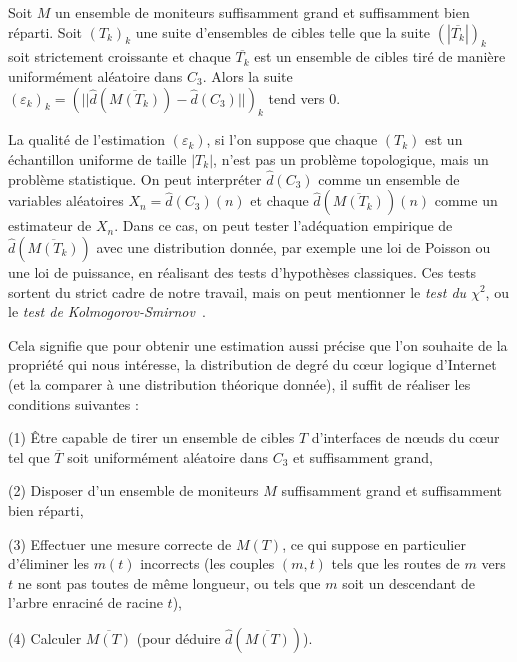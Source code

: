 \begin{proposition} Soit $M$ un ensemble de moniteurs suffisamment grand et suffisamment
bien réparti. Soit $(T_k)_k$ une suite d'ensembles de cibles telle que la suite
$(|\overline{T_k}|)_k$ soit strictement croissante et chaque $\overline{T_k}$
est un ensemble de cibles tiré de manière uniformément aléatoire dans $C_3$.
Alors la suite $(\varepsilon_k)_k = (||\hat{d}(\overline{M(T_k)}) -
\hat{d}(C_3)||)_k$ tend vers 0.
\label{prop:traceroute-estimation}
\end{proposition}

La qualité de l'estimation $(\varepsilon_k)$, si l'on suppose que chaque $(T_k)$
est un échantillon uniforme de taille $|T_k|$, n'est pas un problème
topologique, mais un problème statistique. On peut interpréter $\hat{d}(C_3)$
comme un ensemble de variables aléatoires $X_n = \hat{d}(C_3)(n)$ et chaque
$\hat{d}(\overline{M(T_k)})(n)$ comme un estimateur de $X_n$. Dans ce cas, on
peut tester l'adéquation empirique de $\hat{d}(\overline{M(T_k)})$ avec une
distribution donnée, par exemple une loi de Poisson ou une loi de puissance, en
réalisant des tests d'hypothèses classiques. Ces tests sortent du strict cadre
de notre travail, mais on peut mentionner le {\em test du $\chi^2$}, ou le {\em
test de Kolmogorov-Smirnov}~\cite{stephens1979tests}.

Cela signifie que pour obtenir une estimation aussi précise que l'on souhaite de
la propriété qui nous intéresse, la distribution de degré du cœur logique
d'Internet (et la comparer à une distribution théorique donnée), il suffit de
réaliser les conditions suivantes :
\begin{bulletpoints}
  \item (1) Être capable de tirer un ensemble de cibles $T$ d'interfaces de
  n\oe{}uds du cœur tel que $\overline{T}$ soit uniformément aléatoire dans $C_3$ et
  suffisamment grand,
  \item (2) Disposer d'un ensemble de moniteurs $M$ suffisamment grand et
  suffisamment bien réparti,
  \item (3) Effectuer une mesure correcte de $M(T)$, ce qui suppose en
  particulier d'éliminer les $m(t)$ incorrects (les couples $(m, t)$ tels que les
  routes de $m$ vers $t$ ne sont pas toutes de même longueur, ou tels que $m$
  soit un descendant de l'arbre enraciné de racine $t$),
  \item (4) Calculer $\overline{M(T)}$ (pour déduire
  $\hat{d}(\overline{M(T)})$).
\end{bulletpoints}

